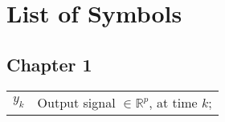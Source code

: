 
\chapter*{List of Symbols}
\vspace{-2.0cm}
\section*{Chapter 1}
      \footnotesize
      \begin{tabular}{lp{10cm}}
      $y_{k}$                  & Output signal $ \in \mathbb{R}^p$, at time $k$;

\end{tabular}
